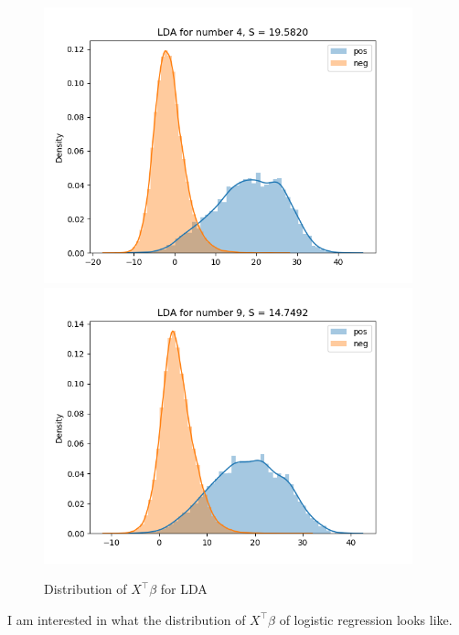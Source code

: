\documentclass{article}
\begin{document}
\begin{figure}[H]
\begin{minipage}{0.19\textwidth}
    \end{minipage}
    \begin{minipage}{0.19\textwidth}
        \centering
        \includegraphics[width=0.95\textwidth]{fig/lda/4.png}
        \includegraphics[width=0.95\textwidth]{fig/lda/9.png}
    \end{minipage}
    \caption{Distribution of $X^\top\beta$ for LDA}
\end{figure}
I am interested in what the distribution of $X^\top\beta$ of logistic regression looks like.
\end{document}

